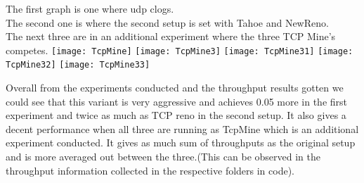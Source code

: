 \documentclass[solution,addpoints,12pt]{exam}
\begin{document}
The first graph is one where udp clogs.\\

The second one is where the second setup is set with Tahoe and NewReno.\\

The next three are in an additional experiment where the three
TCP Mine's competes.
\newpage
\texttt{[image: TcpMine]}
\newpage
\texttt{[image: TcpMine3]}
\newpage
\texttt{[image: TcpMine31]}
\newpage
\texttt{[image: TcpMine32]}
\newpage
\texttt{[image: TcpMine33]}

Overall from the experiments conducted and the throughput results
gotten we could see that this variant is very aggressive
and achieves 0.05 more in the first experiment and twice as
much as TCP reno in the second setup. It also gives a decent
performance when all three are running as TcpMine which is an additional
experiment conducted. It gives as much sum of throughputs as the
original setup and is more averaged out between the three.(This can be
observed in the throughput information collected in the respective folders
in code).
\end{document}

